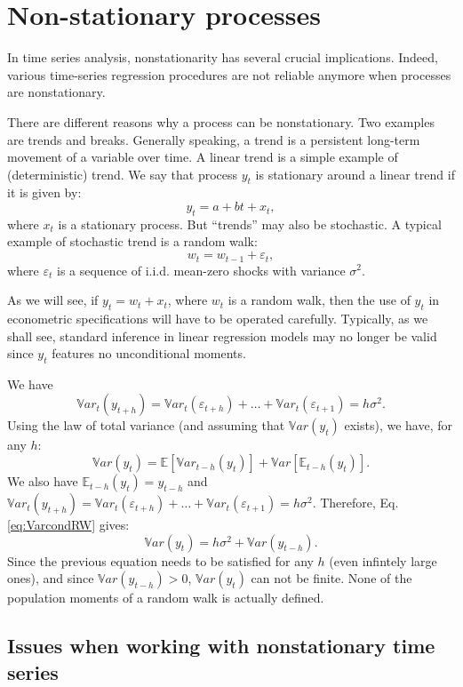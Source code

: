 \documentclass[
  12pt,
]{book}
\theoremstyle{definition}
\theoremstyle{definition}
\theoremstyle{definition}
\theoremstyle{definition}
\theoremstyle{remark}
\begin{document}
\hypertarget{NonStat}{%
\chapter{Non-stationary processes}\label{NonStat}}

In time series analysis, nonstationarity has several crucial implications. Indeed, various time-series regression procedures are not reliable anymore when processes are nonstationary.

There are different reasons why a process can be nonstationary. Two examples are trends and breaks. Generally speaking, a trend is a persistent long-term movement of a variable over time. A linear trend is a simple example of (deterministic) trend. We say that process \(y_t\) is stationary around a linear trend if it is given by:
\[
y_t = a + bt + x_t,
\]
where \(x_t\) is a stationary process. But ``trends'' may also be stochastic. A typical example of stochastic trend is a random walk:
\[
w_t = w_{t-1} + \varepsilon_t,
\]
where \(\varepsilon_t\) is a sequence of i.i.d. mean-zero shocks with variance \(\sigma^2\).

As we will see, if \(y_t = w_t + x_t\), where \(w_t\) is a random walk, then the use of \(y_t\) in econometric specifications will have to be operated carefully. Typically, as we shall see, standard inference in linear regression models may no longer be valid since \(y_t\) features no unconditional moments.

We have
\[
\mathbb{V}ar_t(y_{t+h})=\mathbb{V}ar_t(\varepsilon_{t+h})+\dots+\mathbb{V}ar_t(\varepsilon_{t+1})=h\sigma^2.
\]
Using the law of total variance (and assuming that \(\mathbb{V}ar(y_t)\) exists), we have, for any \(h\):
\begin{equation}
\mathbb{V}ar(y_t) = \mathbb{E}[\mathbb{V}ar_{t-h}(y_{t})]+\mathbb{V}ar[\mathbb{E}_{t-h}(y_{t})].\label{eq:VarcondRW}
\end{equation}
We also have \(\mathbb{E}_{t-h}(y_t)=y_{t-h}\) and \(\mathbb{V}ar_t(y_{t+h})=\mathbb{V}ar_t(\varepsilon_{t+h})+\dots+\mathbb{V}ar_t(\varepsilon_{t+1})=h\sigma^2\). Therefore, Eq. \eqref{eq:VarcondRW} gives:
\[
\mathbb{V}ar(y_t) = h\sigma^2 + \mathbb{V}ar(y_{t-h}).
\]
Since the previous equation needs to be satisfied for any \(h\) (even infintely large ones), and since \(\mathbb{V}ar(y_{t-h})>0\), \(\mathbb{V}ar(y_t)\) can not be finite. None of the population moments of a random walk is actually defined.

\hypertarget{issues-when-working-with-nonstationary-time-series}{%
\section{Issues when working with nonstationary time series}\label{issues-when-working-with-nonstationary-time-series}}
\end{document}
